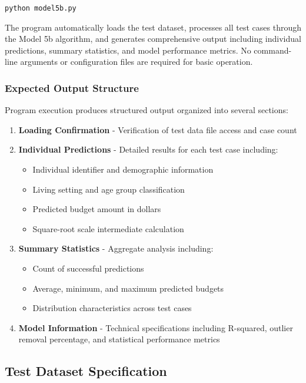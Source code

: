 \begin{verbatim}
python model5b.py
\end{verbatim}

The program automatically loads the test dataset, processes all test cases through the Model 5b algorithm, and generates comprehensive output including individual predictions, summary statistics, and model performance metrics. No command-line arguments or configuration files are required for basic operation.

\subsubsection{Expected Output Structure}

Program execution produces structured output organized into several sections:

\begin{enumerate}
    \item \textbf{Loading Confirmation} - Verification of test data file access and case count
    \item \textbf{Individual Predictions} - Detailed results for each test case including:
        \begin{itemize}
            \item Individual identifier and demographic information
            \item Living setting and age group classification
            \item Predicted budget amount in dollars
            \item Square-root scale intermediate calculation
        \end{itemize}
    \item \textbf{Summary Statistics} - Aggregate analysis including:
        \begin{itemize}
            \item Count of successful predictions
            \item Average, minimum, and maximum predicted budgets
            \item Distribution characteristics across test cases
        \end{itemize}
    \item \textbf{Model Information} - Technical specifications including R-squared, outlier removal percentage, and statistical performance metrics
\end{enumerate}

\subsection{Test Dataset Specification}

